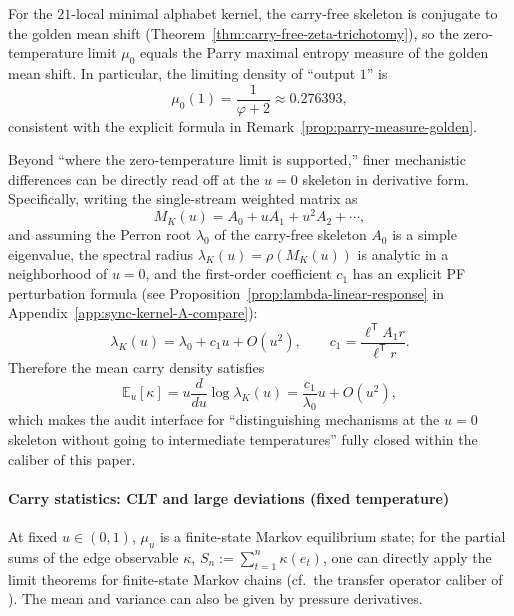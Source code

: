 \begin{corollary}\label{cor:kernel-21-ground-state}
For the $21$-local minimal alphabet kernel, the carry-free skeleton is conjugate to the golden mean shift (Theorem~\ref{thm:carry-free-zeta-trichotomy}), so the zero-temperature limit $\mu_0$ equals the Parry maximal entropy measure of the golden mean shift. In particular, the limiting density of ``output $1$'' is
\[
\mu_0(1)=\frac{1}{\varphi+2}\approx 0.276393,
\]
consistent with the explicit formula in Remark~\ref{prop:parry-measure-golden}.
\end{corollary}

\begin{remark}[``Differentiable fingerprint'' of the zero-temperature spectrum: first-order response read from the \texorpdfstring{$u=0$}{u=0} skeleton]\label{rem:kernel-zero-temp-differential-fingerprint}
Beyond ``where the zero-temperature limit is supported,'' finer mechanistic differences can be directly read off at the \(u=0\) skeleton in derivative form.
Specifically, writing the single-stream weighted matrix as
$$
M_K(u)=A_0+uA_1+u^2A_2+\cdots,
$$
and assuming the Perron root \(\lambda_0\) of the carry-free skeleton \(A_0\) is a simple eigenvalue, the spectral radius \(\lambda_K(u)=\rho(M_K(u))\) is analytic in a neighborhood of \(u=0\), and the first-order coefficient \(c_1\) has an explicit PF perturbation formula (see Proposition~\ref{prop:lambda-linear-response} in Appendix~\ref{app:sync-kernel-A-compare}):
$$
\lambda_K(u)=\lambda_0+c_1u+O(u^2),
\qquad
c_1=\frac{\ell^{\mathsf T}A_1 r}{\ell^{\mathsf T}r}.
$$
Therefore the mean carry density satisfies
$$
\mathbb{E}_u[\kappa]
=u\frac{d}{du}\log\lambda_K(u)
=\frac{c_1}{\lambda_0}u+O(u^2),
$$
which makes the audit interface for ``distinguishing mechanisms at the \(u=0\) skeleton without going to intermediate temperatures'' fully closed within the caliber of this paper.
\end{remark}

\paragraph{Carry statistics: CLT and large deviations (fixed temperature)}
At fixed $u\in(0,1)$, $\mu_u$ is a finite-state Markov equilibrium state; for the partial sums of the edge observable $\kappa$,
\(
S_n:=\sum_{t=1}^{n}\kappa(e_t)
\),
one can directly apply the limit theorems for finite-state Markov chains (cf.\ the transfer operator caliber of \cite{Ruelle1978Thermodynamic}). The mean and variance can also be given by pressure derivatives.

